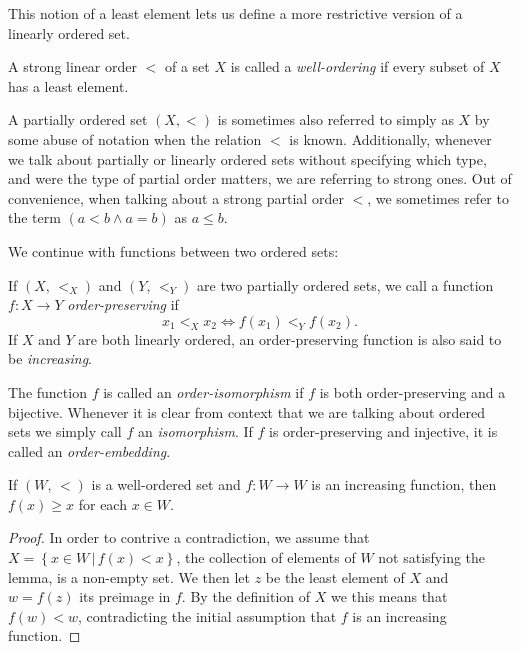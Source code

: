 \documentclass[../../main.tex]{subfiles}
\begin{document}
This notion of a least element lets us define a more restrictive version of a linearly ordered set.
\begin{definition}\cite[p.13]{Jec78}
    A strong linear order $<$ of a set $X$ is called a \textit{well-ordering} if every subset of $X$ has a least element.
\end{definition}

A partially ordered set $(X, <)$ is sometimes also referred to simply as $X$ by some abuse of notation when the relation $<$ is known.
Additionally, whenever we talk about partially or linearly ordered sets without specifying which type, and were the type of partial order matters, we are referring to strong ones. \cite[p.12]{Jec78}
Out of convenience, when talking about a strong partial order $<$, we sometimes refer to the term $\left(a < b \wedge a = b\right)$ as $a \leq b$.

We continue with functions between two ordered sets:
\begin{definition}\cite[p.13]{Jec78}
    If $\left(X,\, <_X\right)$ and $\left(Y,\, <_Y\right)$ are two partially ordered sets, we call a function $f: X \to Y$ \textit{order-preserving} if
    $$x_1 <_X x_2 \iff f(x_1) <_Y f(x_2).$$
    If $X$ and $Y$ are both linearly ordered, an order-preserving function is also said to be \textit{increasing}.

    The function $f$ is called an \textit{order-isomorphism} if $f$ is both order-preserving and a bijective.
    Whenever it is clear from context that we are talking about ordered sets we simply call $f$ an \textit{isomorphism}.
    If $f$ is order-preserving and injective, it is called an \textit{order-embedding}. \cite[p.167]{Gol17}
\end{definition}

\begin{lemma}\label{increasing-fcn-lemm}\cite[Lemma 2.1, p.13]{Jec78}
    If $\left(W,\, <\right)$ is a well-ordered set and $f: W \to W$ is an increasing function, then $f(x) \geq x$ for each $x\in W$.
\end{lemma}

\begin{proof}\cite[Lemma 2.1, p.13]{Jec78}
    In order to contrive a contradiction, we assume that $X = \left\{x \in W \,\vert\, f(x) < x\right\}$, the collection of elements of $W$ not satisfying the lemma, is a non-empty set.
    We then let $z$ be the least element of $X$ and $w = f(z)$ its preimage in $f$.
    By the definition of $X$ we this means that $f(w) < w$, contradicting the initial assumption that $f$ is an increasing function.
\end{proof}
\end{document}
